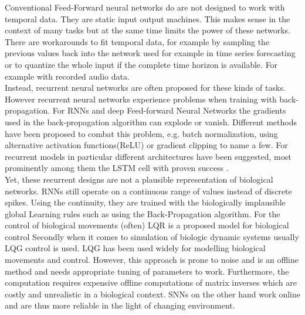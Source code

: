 Conventional Feed-Forward neural networks do are not designed to work with temporal data. They are static input output machines. This makes sense in the context of many tasks but at the same time limits the power of these networks. There are workarounds to fit temporal data, for example by sampling the previous values back into the network used for example in time series forecasting \cite{tang_feedforward_1993}\cite{yang_cascade_2022}\cite{uncini_audio_2003} or to quantize the whole input if the complete time horizon is available. For example with recorded audio data.\\
Instead, recurrent neural networks are often proposed for these kinds of tasks. However recurrent neural networks experience problems when training with back-propagation\cite{bengio_learning_1994}. For \acp{RNN} and deep Feed-forward Neural Networks the gradients used in the back-propagation algorithm can explode or vanish. Different methods have been proposed to combat this problem, e.g. batch normalization\cite{ioffe_batch_2015}, using alternative activation functions(ReLU)\cite{nair_rectified_2010} or gradient clipping\cite{pascanu_difficulty_2013} to name a few. For recurrent models in particular different architectures have been suggested, most prominently among them the LSTM cell \cite{hochreiter_long_1997} with proven success \cite{mayer_system_2006, sak_long_2014, li_constructing_2015}.\\
Yet, these recurrent designs are not a plausible representation of biological networks.
\acp{RNN} still operate on a continuous range of values instead of discrete spikes. Using the continuity, they are trained with the biologically implausible global Learning rules such as using the Back-Propagation algorithm.
For the control of biological movements (often) \ac{LQR} is a proposed model for biological control \cite{li_iterative_2004}
Secondly when it comes to simulation of biologic dynamic systems usually \ac{LQG} control is used. LQG has been used widely for modelling biological movements and control. However, this approach is prone to noise and is an offline method and needs appropriate tuning of parameters to work. Furthermore, the computation requires expensive offline computations of matrix inverses which are costly and unrealistic in a biological context.
\acp{SNN} on the other hand work online and are thus more reliable in the light of changing environment.\\

